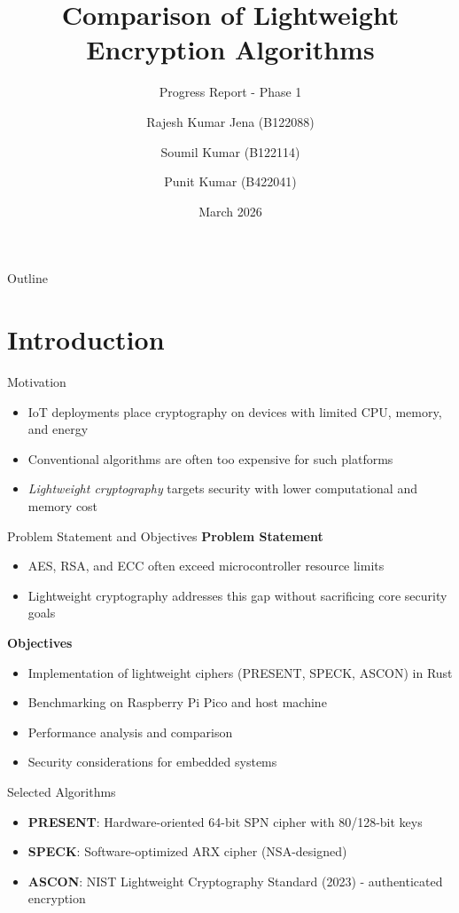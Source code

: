 \documentclass[aspectratio=169]{beamer}
\title[Lightweight Encryption]{Comparison of Lightweight Encryption Algorithms}
\subtitle{Progress Report - Phase 1}
\author[R. Jena, S. Kumar, P. Kumar]{
Rajesh Kumar Jena (B122088) \and
Soumil Kumar (B122114) \and
Punit Kumar (B422041)
}
\institute{
International Institute of Information Technology\\
Bhubaneswar\\
Supervisor: Prof. Debasish Jena
}
\date{March 2026}
\begin{document}
\begin{frame}
\titlepage
\end{frame}

\begin{frame}{Outline}
\tableofcontents
\end{frame}

\section{Introduction}

\begin{frame}{Motivation}
\begin{itemize}
    \item IoT deployments place cryptography on devices with limited CPU, memory, and energy
    \item Conventional algorithms are often too expensive for such platforms
    \item \textit{Lightweight cryptography} targets security with lower computational and memory cost
\end{itemize}
\end{frame}

\begin{frame}{Problem Statement and Objectives}
\textbf{Problem Statement}
\begin{itemize}
    \item AES, RSA, and ECC often exceed microcontroller resource limits
    \item Lightweight cryptography addresses this gap without sacrificing core security goals
\end{itemize}

\vspace{0.3cm}
\textbf{Objectives}
\begin{itemize}
    \item Implementation of lightweight ciphers (PRESENT, SPECK, ASCON) in Rust
    \item Benchmarking on Raspberry Pi Pico and host machine
    \item Performance analysis and comparison
    \item Security considerations for embedded systems
\end{itemize}
\end{frame}

\begin{frame}{Selected Algorithms}
\begin{itemize}
    \item \textbf{PRESENT}: Hardware-oriented 64-bit SPN cipher with 80/128-bit keys
    \item \textbf{SPECK}: Software-optimized ARX cipher (NSA-designed)
    \item \textbf{ASCON}: NIST Lightweight Cryptography Standard (2023) - authenticated encryption
\end{itemize}
\end{frame}
\end{document}
